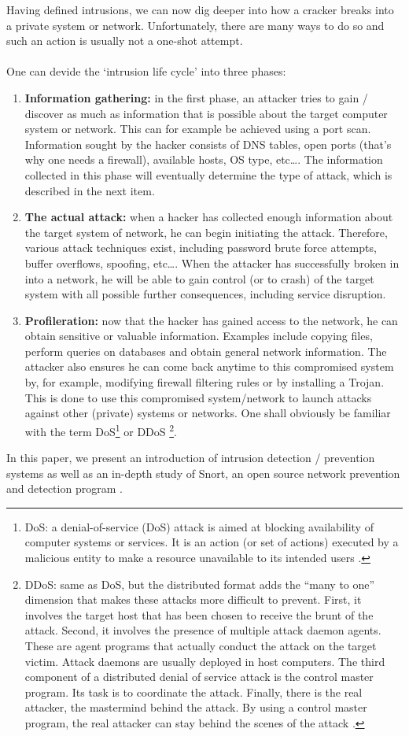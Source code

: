 Having defined intrusions, we can now dig deeper into how a cracker breaks into a private system or network. Unfortunately, there are many ways to do so and such an action is usually not a one-shot attempt. \\ \\
One can devide the `intrusion life cycle' into three phases:
\begin{enumerate}
\item \textbf{Information gathering:} in the first phase, an attacker tries to gain / discover as much as information that is possible about the target computer system or network. This can for example be achieved using a port scan. Information sought by the hacker consists of DNS tables, open ports (that's why one needs a firewall), available hosts, OS type, etc\ldots. The information collected in this phase will eventually determine the type of attack, which is described in the next item.
\item \textbf{The actual attack:} when a hacker has collected enough information about the target system of network, he can begin initiating the attack. Therefore, various attack techniques exist, including password brute force attempts, buffer overflows, spoofing, etc\ldots. When the attacker has successfully broken in into a network, he will be able to gain control (or to crash) of the target system with all possible further consequences, including service disruption.
\item \textbf{Profileration:} now that the hacker has gained access to the network, he can obtain sensitive or valuable information. Examples include copying files, perform queries on databases and obtain general network information. The attacker also ensures he can come back anytime to this compromised system by, for example, modifying firewall filtering rules or by installing a Trojan. This is done to use this compromised system/network to launch attacks against other (private) systems or networks. One shall obviously be familiar with the term DoS\footnote{DoS: a denial-of-service (DoS) attack is aimed at blocking availability of computer systems or services. It is an action (or set of actions) executed by a malicious entity to make a resource unavailable to its intended users \citep{Dos}.} or DDoS \footnote{DDoS: same as DoS, but the distributed format adds the ``many to one'' dimension that makes these attacks more difficult to prevent. First, it involves the target host that has been chosen to receive the brunt of the attack. Second, it involves the presence of multiple attack daemon agents. These are agent programs that actually conduct the attack on the target victim. Attack
daemons are usually deployed in host computers. The third component of a distributed denial of service attack is the control master program. Its task is to coordinate the attack.
Finally, there is the real attacker, the mastermind behind the attack. By using a control master program, the real attacker can stay behind the scenes of the attack \citep{Ddos}.}.
\end{enumerate}

In this paper, we present an introduction of intrusion detection / prevention systems as well as an in-depth study of Snort, an open source network prevention and detection program \citep{Snort}.